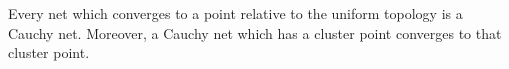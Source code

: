 Every net which converges to a point relative to the uniform topology is a Cauchy net. Moreover, a Cauchy net which has a cluster point converges to that cluster point.
